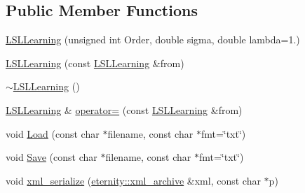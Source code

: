 \subsection*{Public Member Functions}
\begin{DoxyCompactItemize}
\item 
\hyperlink{classtsa_1_1_l_s_l_learning_ab1065fd9f61b44f25c4a9ee67e95dc1e}{L\+S\+L\+Learning} (unsigned int Order, double sigma, double lambda=1.)
\item 
\hyperlink{classtsa_1_1_l_s_l_learning_ae1d9f9ea754c88bf19365c680ea2415a}{L\+S\+L\+Learning} (const \hyperlink{classtsa_1_1_l_s_l_learning}{L\+S\+L\+Learning} \&from)
\item 
\hyperlink{classtsa_1_1_l_s_l_learning_aab97f819bb4e1537621d9e84ee0bf140}{$\sim$\+L\+S\+L\+Learning} ()
\item 
\hyperlink{classtsa_1_1_l_s_l_learning}{L\+S\+L\+Learning} \& \hyperlink{classtsa_1_1_l_s_l_learning_a8b2b47d740bd2207f612e9c4aadaf220}{operator=} (const \hyperlink{classtsa_1_1_l_s_l_learning}{L\+S\+L\+Learning} \&from)
\item 
void \hyperlink{classtsa_1_1_l_s_l_learning_a0faa13eb2f31988b73c4740c3e1c4085}{Load} (const char $\ast$filename, const char $\ast$fmt=\char`\"{}txt\char`\"{})
\item 
void \hyperlink{classtsa_1_1_l_s_l_learning_aa3397a1d3944fb4ce19c612d74e7018a}{Save} (const char $\ast$filename, const char $\ast$fmt=\char`\"{}txt\char`\"{})
\item 
void \hyperlink{classtsa_1_1_l_s_l_learning_a54c30966b4ddf0327ef5f4b9a8b774f1}{xml\+\_\+serialize} (\hyperlink{classeternity_1_1xml__archive}{eternity\+::xml\+\_\+archive} \&xml, const char $\ast$p)
\end{DoxyCompactItemize}

